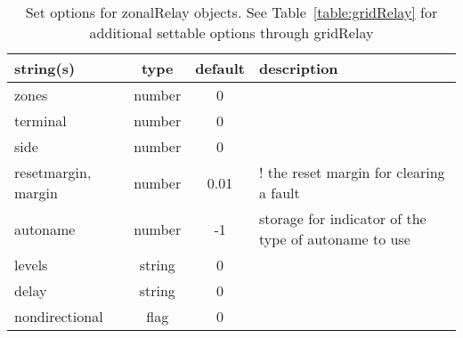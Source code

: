 \begin{table}[ht]
\centering
\begin{tabular}{p{5cm} c c p{7cm}}
\hline
string(s) & type & default & description \\
\hline
zones & number & 0 & \\
terminal & number & 0 & \\
side & number & 0 & \\
resetmargin, margin & number & 0.01 & ! the reset margin for clearing a fault\\
autoname & number & -1 & storage for indicator of the type of autoname to use\\
levels & string & 0 & \\
delay & string & 0 & \\
nondirectional & flag & 0 & \\
\hline
\end{tabular}
\caption{Set options for zonalRelay objects. See Table~\ref{table:gridRelay} for additional settable options through gridRelay}
\label{table:zonalRelay}
\end{table}

